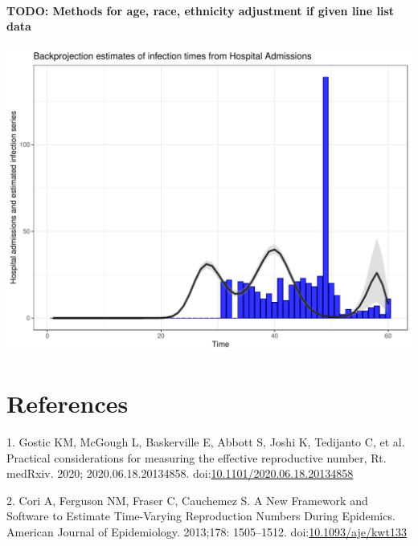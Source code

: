 \documentclass[
]{article}
\begin{document}
\hypertarget{todo-methods-for-age-race-ethnicity-adjustment-if-given-line-list-data}{%
\paragraph{TODO: Methods for age, race, ethnicity adjustment if given
line list
data}\label{todo-methods-for-age-race-ethnicity-adjustment-if-given-line-list-data}}

\begin{flushleft}\includegraphics{Testing_Writeup_files/figure-latex/backproj-1} \end{flushleft}

\hypertarget{references}{%
\section*{References}\label{references}}

\hypertarget{refs}{}
\leavevmode\hypertarget{ref-gosticPracticalConsiderationsMeasuring2020}{}%
1. Gostic KM, McGough L, Baskerville E, Abbott S, Joshi K, Tedijanto C,
et al. Practical considerations for measuring the effective reproductive
number, Rt. medRxiv. 2020; 2020.06.18.20134858.
doi:\href{https://doi.org/10.1101/2020.06.18.20134858}{10.1101/2020.06.18.20134858}

\leavevmode\hypertarget{ref-coriNewFrameworkSoftware2013}{}%
2. Cori A, Ferguson NM, Fraser C, Cauchemez S. A New Framework and
Software to Estimate Time-Varying Reproduction Numbers During Epidemics.
American Journal of Epidemiology. 2013;178: 1505--1512.
doi:\href{https://doi.org/10.1093/aje/kwt133}{10.1093/aje/kwt133}
\end{document}
